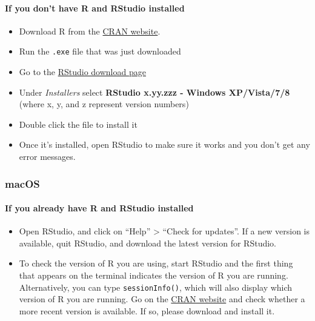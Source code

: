 \documentclass[]{book}
\providecommand{\tightlist}{%
  \setlength{\itemsep}{0pt}\setlength{\parskip}{0pt}}
\let\oldparagraph\paragraph
\renewcommand{\paragraph}[1]{\oldparagraph{#1}\mbox{}}
\begin{document}
\paragraph{If you don't have R and RStudio
installed}\label{if-you-dont-have-r-and-rstudio-installed}

\begin{itemize}
\tightlist
\item
  Download R from the
  \href{http://cran.r-project.org/bin/windows/base/release.htm}{CRAN
  website}.
\item
  Run the \texttt{.exe} file that was just downloaded
\item
  Go to the
  \href{https://www.rstudio.com/products/rstudio/download/\#download}{RStudio
  download page}
\item
  Under \emph{Installers} select \textbf{RStudio x.yy.zzz - Windows
  XP/Vista/7/8} (where x, y, and z represent version numbers)
\item
  Double click the file to install it
\item
  Once it's installed, open RStudio to make sure it works and you don't
  get any error messages.
\end{itemize}

\subsubsection{macOS}\label{macos}

\paragraph{If you already have R and RStudio
installed}\label{if-you-already-have-r-and-rstudio-installed-1}

\begin{itemize}
\tightlist
\item
  Open RStudio, and click on ``Help'' \textgreater{} ``Check for
  updates''. If a new version is available, quit RStudio, and download
  the latest version for RStudio.
\item
  To check the version of R you are using, start RStudio and the first
  thing that appears on the terminal indicates the version of R you are
  running. Alternatively, you can type \texttt{sessionInfo()}, which
  will also display which version of R you are running. Go on the
  \href{https://cran.r-project.org/bin/macosx/}{CRAN website} and check
  whether a more recent version is available. If so, please download and
  install it.
\end{itemize}
\end{document}
